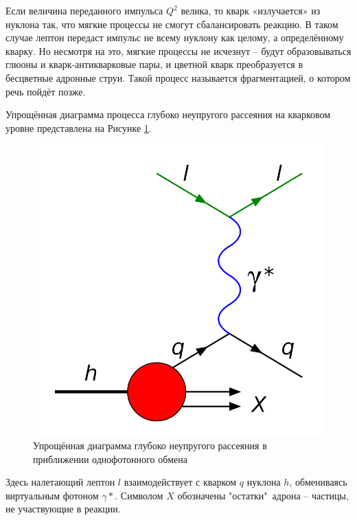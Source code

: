 \documentclass{extarticle}
\begin{document}
Если величина переданного импульса $Q^2$ велика, то кварк «излучается» из нуклона так, что мягкие процессы не смогут сбалансировать реакцию. В таком случае лептон передаст импульс не всему нуклону как целому, а определённому кварку. Но несмотря на это, мягкие процессы не исчезнут – будут образовываться глюоны и кварк-антикварковые пары, и цветной кварк преобразуется в бесцветные адронные струи. Такой процесс называется фрагментацией, о котором речь пойдёт позже.

Упрощённая диаграмма процесса глубоко неупругого рассеяния на кварковом уровне представлена на Рисунке \ref{fig:DIS}.


\begin{figure}[h]
    \centering
    \includegraphics[width = 0.7\linewidth]{DIS.png}
    \caption{Упрощённая диаграмма глубоко неупругого рассеяния в приближении однофотонного обмена}
    \label{fig:DIS}
\end{figure}

Здесь налетающий лептон $l$ взаимодействует с кварком $q$ нуклона $h$, обмениваясь виртуальным фотоном $\gamma*$. Символом $X$ обозначены "остатки"\  адрона -- частицы, не участвующие в реакции.
\end{document}
